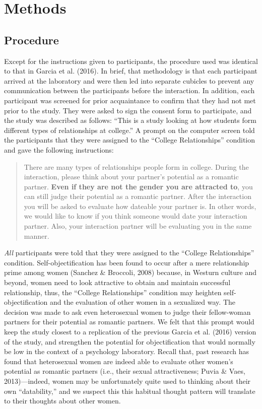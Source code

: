 \documentclass[man]{apa6}
\begin{document}
\section{Methods}\label{methods}

\subsection{Procedure}\label{procedure}

Except for the instructions given to participants, the procedure used
was identical to that in Garcia et al. (2016). In brief, that
methodology is that each participant arrived at the laboratory and were
then led into separate cubicles to prevent any communication between the
participants before the interaction. In addition, each participant was
screened for prior acquaintance to confirm that they had not met prior
to the study. They were asked to sign the consent form to participate,
and the study was described as follows: \enquote{This is a study looking
at how students form different types of relationships at college.} A
prompt on the computer screen told the participants that they were
assigned to the \enquote{College Relationships} condition and gave the
following instructions:

\begin{quote}
There are many types of relationships people form in college. During the
interaction, please think about your partner's potential as a romantic
partner. \textbf{Even if they are not the gender you are attracted to},
you can still judge their potential as a romantic partner. After the
interaction you will be asked to evaluate how dateable your partner is.
In other words, we would like to know if you think someone would date
your interaction partner. Also, your interaction partner will be
evaluating you in the same manner.
\end{quote}

\emph{All} participants were told that they were assigned to the
\enquote{College Relationships} condition. Self-objectification has been
found to occur after a mere relationship prime among women (Sanchez \&
Broccoli, 2008) because, in Westurn culture and beyond, women need to
look attractive to obtain and maintain successful relationship, thus,
the \enquote{College Relationships} condition may heighten
self-objectification and the evaluation of other women in a sexualized
way. The decision was made to ask even heterosexual women to judge their
fellow-woman partners for their potential as romantic partners. We felt
that this prompt would keep the study closest to a replication of the
previous Garcia et al. (2016) version of the study, and strengthen the
potential for objectification that would normally be low in the context
of a psychology laboratory. Recall that, past research has found that
heterosexual women are indeed able to evaluate other women's potential
as romantic partners (i.e., their sexual attractiveness; Puvia \& Vaes,
2013)---indeed, women may be unfortunately quite used to thinking about
their own \enquote{datability,} and we suspect this this habitual
thought pattern will translate to their thoughts about other women.
\end{document}
